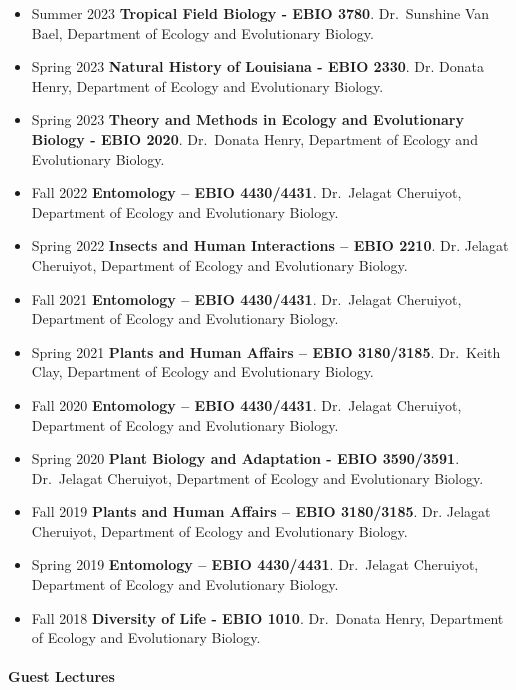 \documentclass[11pt,a4paper,]{awesome-cv}
\begin{document}
\begin{itemize}
\item
  Summer 2023 \textbar{} \textbf{Tropical Field Biology - EBIO 3780}.
  Dr.~Sunshine Van Bael, Department of Ecology and Evolutionary Biology.
\item
  Spring 2023 \textbar{} \textbf{Natural History of Louisiana - EBIO
  2330}. Dr. Donata Henry, Department of Ecology and Evolutionary
  Biology.
\item
  Spring 2023 \textbar{} \textbf{Theory and Methods in Ecology and
  Evolutionary Biology - EBIO 2020}. Dr.~Donata Henry, Department of
  Ecology and Evolutionary Biology.
\item
  Fall 2022 \textbar{} \textbf{Entomology -- EBIO 4430/4431}.
  Dr.~Jelagat Cheruiyot, Department of Ecology and Evolutionary Biology.
\item
  Spring 2022 \textbar{} \textbf{Insects and Human Interactions -- EBIO
  2210}. Dr. Jelagat Cheruiyot, Department of Ecology and Evolutionary
  Biology.
\item
  Fall 2021 \textbar{} \textbf{Entomology -- EBIO 4430/4431}.
  Dr.~Jelagat Cheruiyot, Department of Ecology and Evolutionary Biology.
\item
  Spring 2021 \textbar{} \textbf{Plants and Human Affairs -- EBIO
  3180/3185}. Dr.~Keith Clay, Department of Ecology and Evolutionary
  Biology.
\item
  Fall 2020 \textbar{} \textbf{Entomology -- EBIO 4430/4431}.
  Dr.~Jelagat Cheruiyot, Department of Ecology and Evolutionary Biology.
\item
  Spring 2020 \textbar{} \textbf{Plant Biology and Adaptation - EBIO
  3590/3591}. Dr.~Jelagat Cheruiyot, Department of Ecology and
  Evolutionary Biology.
\item
  Fall 2019 \textbar{} \textbf{Plants and Human Affairs -- EBIO
  3180/3185}. Dr. Jelagat Cheruiyot, Department of Ecology and
  Evolutionary Biology.
\item
  Spring 2019 \textbar{} \textbf{Entomology -- EBIO 4430/4431}.
  Dr.~Jelagat Cheruiyot, Department of Ecology and Evolutionary Biology.
\item
  Fall 2018 \textbar{} \textbf{Diversity of Life - EBIO 1010}.
  Dr.~Donata Henry, Department of Ecology and Evolutionary Biology.
\end{itemize}

\hypertarget{guest-lectures}{%
\paragraph{Guest Lectures}\label{guest-lectures}}
\end{document}
